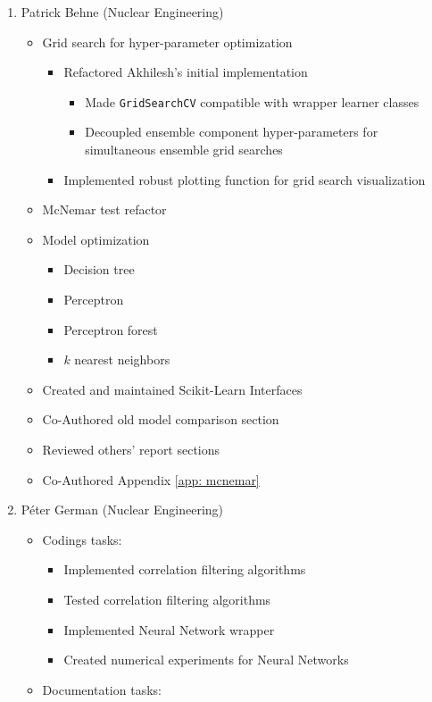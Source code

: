 \documentclass[paper=a4, fontsize=11pt]{scrartcl} %
\begin{document}
\begin{enumerate}
\begin{itemize}
	\end{itemize}
	\item Patrick Behne (Nuclear Engineering)
	\begin{itemize}
		\item Grid search for hyper-parameter optimization
		\begin{itemize}
			\item Refactored Akhilesh's initial implementation
			\begin{itemize}
				\item Made \verb|GridSearchCV| compatible with wrapper learner classes
				\item Decoupled ensemble component hyper-parameters for simultaneous ensemble grid searches
			\end{itemize}
			\item Implemented robust plotting function for grid search visualization
		\end{itemize}
		\item McNemar test refactor
		\item Model optimization
		\begin{itemize}
			\item Decision tree
			\item Perceptron
			\item Perceptron forest
			\item $k$ nearest neighbors
		\end{itemize}
		\item Created and maintained Scikit-Learn Interfaces
		\item Co-Authored old model comparison section
		\item Reviewed others' report sections
		\item Co-Authored Appendix \ref{app: mcnemar}
	\end{itemize}
	\item P\'eter German (Nuclear Engineering)
	\begin{itemize}
		\item Codings tasks:
		\begin{itemize}
			\item Implemented correlation filtering algorithms
			\item Tested correlation filtering algorithms
			\item Implemented Neural Network wrapper
			\item Created numerical experiments for Neural Networks
		\end{itemize}
		\item Documentation tasks:

\end{itemize}
\end{enumerate}
\end{document}

